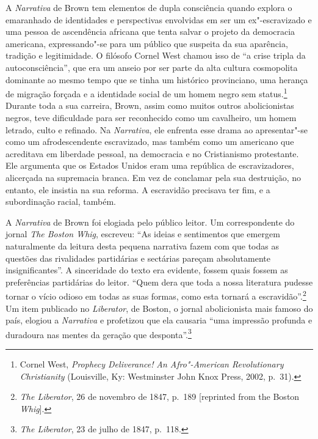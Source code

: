 A \emph{Narrativa} de Brown tem elementos de dupla consciência quando
explora o emaranhado de identidades e perspectivas envolvidas em ser um
ex"-escravizado e uma pessoa de ascendência africana que tenta salvar o
projeto da democracia americana, expressando"-se para um público que
suspeita da sua aparência, tradição e legitimidade. O filósofo Cornel
West chamou isso de ``a crise tripla da autoconsciência'', que era um
anseio por ser parte da alta cultura cosmopolita dominante ao mesmo
tempo que se tinha um histórico provinciano, uma herança de migração
forçada e a identidade social de um homem negro sem status.\footnote{Cornel
  West, \emph{Prophecy Deliverance!} \emph{An Afro"-American
  Revolutionary Christianity} (Louisville, Ky: Westminster John Knox
  Press, 2002, p.~31).} Durante toda a sua carreira, Brown, assim como
muitos outros abolicionistas negros, teve dificuldade para ser
reconhecido como um cavalheiro, um homem letrado, culto e refinado. Na
\emph{Narrativa}, ele enfrenta esse drama ao apresentar"-se como um
afrodescendente escravizado, mas também como um americano que acreditava
em liberdade pessoal, na democracia e no Cristianismo protestante. Ele
argumenta que os Estados Unidos eram uma república de escravizadores,
alicerçada na supremacia branca. Em vez de conclamar pela sua
destruição, no entanto, ele insistia na sua reforma. A escravidão
precisava ter fim, e a subordinação racial, também.

A \emph{Narrativa} de Brown foi elogiada pelo público leitor. Um
correspondente do jornal \emph{The Boston Whig}, escreveu: ``As ideias e
sentimentos que emergem naturalmente da leitura desta pequena narrativa
fazem com que todas as questões das rivalidades partidárias e sectárias
pareçam absolutamente insignificantes''. A sinceridade do texto era
evidente, fossem quais fossem as preferências partidárias do leitor.
``Quem dera que toda a nossa literatura pudesse tornar o vício odioso em
todas as suas formas, como esta tornará a escravidão''.\footnote{\emph{The
  Liberator}, 26 de novembro de 1847, p.~189 {[}reprinted from the Boston
  \emph{Whig}{]}.} Um item publicado no \emph{Liberator}, de Boston, o
jornal abolicionista mais famoso do país, elogiou a \emph{Narrativa} e
profetizou que ela causaria ``uma impressão profunda e duradoura nas
mentes da geração que desponta''.\footnote{\emph{The Liberator}, 23 de
  julho de 1847, p.~118.}



